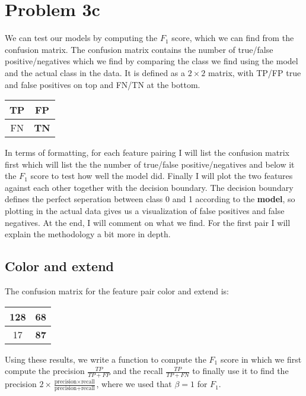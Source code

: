 \section*{Problem 3c}

We can test our models by computing the $F_1$ score, which we can find from the confusion matrix. The confusion matrix contains the number of true/false positive/negatives which we find by comparing the class we find using the model and the actual class in the data. It is defined as a $2 \times 2$ matrix, with TP/FP true and false positives on top and FN/TN at the bottom. 

\begin{table}[!h]
\centering
\begin{tabular}{c|c}
\textbf{TP} & FP\\ \hline
FN &   \textbf{TN}\\
\end{tabular}
\end{table}

In terms of formatting, for each feature pairing I will list the confusion matrix first which will list the the number of true/false positive/negatives and below it the $F_1$ score to test how well the model did. Finally I will plot the two features against each other together with the decision boundary. The decision boundary defines the perfect seperation between class 0 and 1 according to the \textbf{model}, so plotting in the actual data gives us a visualization of false positives and false negatives. At the end, I will comment on what we find. For the first pair I will explain the methodology a bit more in depth. 

\newpage
\subsection*{Color and extend}

The confusion matrix for the feature pair color and extend is:

\begin{table}[!h]
\centering
\begin{tabular}{c|c}
\textbf{128} & 68\\ \hline
17 &   \textbf{87}\\
\end{tabular}
\end{table}

Using these results, we write a function to compute the $F_1$ score in which we first compute the precision $\frac{TP}{TP + FP}$ and the recall $\frac{TP}{TP + FN}$ to finally use it to find the precision $2 \times \frac{\text{precision} \times \text{recall}}{\text{precision} + \text{recall}}$, where we used that $\beta = 1$ for $F_1$.\\

